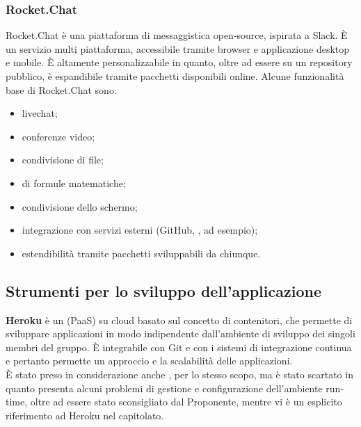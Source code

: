 \subsubsection{Rocket.Chat}
Rocket.Chat è una piattaforma di messaggistica open-source, ispirata a Slack. \`{E} un servizio multi piattaforma, accessibile tramite browser e applicazione desktop e mobile. \`{E} altamente personalizzabile in quanto, oltre ad essere su un repository pubblico, è espandibile tramite pacchetti disponibili online. Alcune funzionalità base di Rocket.Chat sono:
\begin{itemize}
	\item livechat;
	\item conferenze video;
	\item condivisione di file;
	\item {} di formule matematiche;
	\item condivisione dello schermo;
	\item integrazione con servizi esterni (GitHub, ,  ad esempio);
	\item estendibilità tramite pacchetti sviluppabili da chiunque.
\end{itemize}

\subsection{Strumenti per lo sviluppo dell'applicazione}
\textbf{Heroku} è un  (PaaS) su cloud basato sul concetto di contenitori, che permette di sviluppare applicazioni in modo indipendente dall'ambiente di sviluppo dei singoli membri del gruppo. \`{E} integrabile con Git e con i sistemi di integrazione continua e pertanto permette un approccio  e la scalabilità delle applicazioni.\\
\`{E} stato preso in considerazione anche , per lo stesso scopo, ma è stato scartato in quanto presenta alcuni problemi di gestione e configurazione dell'ambiente run-time, oltre ad essere stato sconsigliato dal Proponente, mentre vi è un esplicito riferimento ad Heroku nel capitolato.


